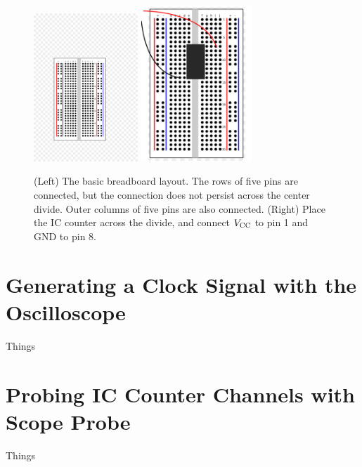 \documentclass{article}
\begin{document}
\begin{figure}
\centering
\includegraphics[width=0.35\textwidth,trim=5cm 6cm 9cm 13cm,clip=true]{breadboard.jpg} \hspace{0.5cm}
\includegraphics[width=0.37\textwidth]{breadboard_power.pdf}
\caption{\label{fig:count2} (Left) The basic breadboard layout.  The rows of five pins are connected, but the connection does not persist across the center divide.  Outer columns of five pins are also connected. (Right) Place the IC counter across the divide, and connect $V_{\rm CC}$ to pin 1 and GND to pin 8.}
\end{figure}

\section{Generating a Clock Signal with the Oscilloscope}

Things

\section{Probing IC Counter Channels with Scope Probe}

Things
\end{document}
